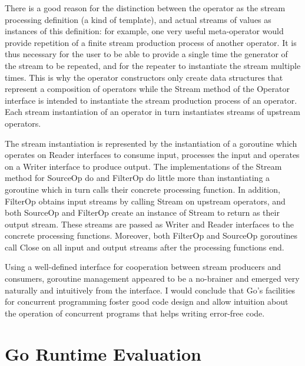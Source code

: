 \documentclass {article}
\begin{document}
There is a good reason for the distinction between the operator as the stream processing definition (a kind of template), and actual streams of values as instances of this definition: for example, one very useful meta-operator would provide repetition of a finite stream production process of another operator. It is thus necessary for the user to be able to provide a single time the generator of the stream to be repeated, and for the repeater to instantiate the stream multiple times. This is why the operator constructors only create data structures that represent a composition of operators while the Stream method of the Operator interface is intended to instantiate the stream production process of an operator. Each stream instantiation of an operator in turn instantiates streams of upstream operators.

The stream instantiation is represented by the instantiation of a goroutine which operates on Reader interfaces to consume input, processes the input and operates on a Writer interface to produce output. The implementations of the Stream method for SourceOp do and FilterOp do little more than instantiating a goroutine which in turn calls their concrete processing function. In addition, FilterOp obtains input streams by calling Stream on upstream operators, and both SourceOp and FilterOp create an instance of Stream to return as their output stream. These streams are passed as Writer and Reader interfaces to the concrete processing functions. Moreover, both FilterOp and SourceOp goroutines call Close on all input and output streams after the processing functions end.

Using a well-defined interface for cooperation between stream producers and consumers, goroutine management appeared to be a no-brainer and emerged very naturally and intuitively from the interface. I would conclude that Go's facilities for concurrent programming foster good code design and allow intuition about the operation of concurrent programs that helps writing error-free code.

\section{Go Runtime Evaluation}
\label{sec:runtime}
\end{document}
